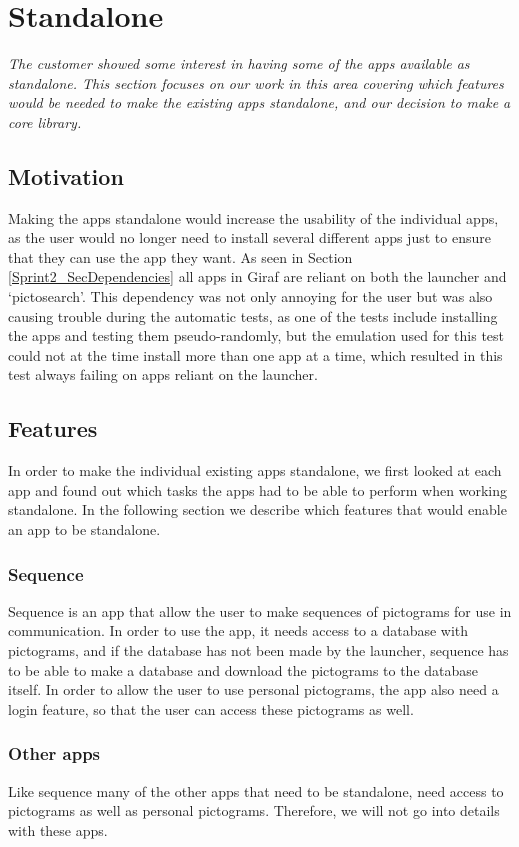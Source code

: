 \section{Standalone} \label{Sprint2_SecStandalone}
\textit{The customer showed some interest in having some of the apps available as standalone. This section focuses on our work in this area covering which features would be needed to make the existing apps standalone, and our decision to make a core library.}

\subsection{Motivation}
Making the apps standalone would increase the usability of the individual apps, as the user would no longer need to install several different apps just to ensure that they can use the app they want. As seen in Section \ref{Sprint2_SecDependencies} all apps in Giraf are reliant on both the launcher and ‘pictosearch’. This dependency was not only annoying for the user but was also causing trouble during the automatic tests, as one of the tests include installing the apps and testing them pseudo-randomly, but the emulation used for this test could not at the time install more than one app at a time, which resulted in this test always failing on apps reliant on the launcher.

\subsection{Features}
In order to make the individual existing apps standalone, we first looked at each app and found out which tasks the apps had to be able to perform when working standalone. In the following section we describe which features that would enable an app to be standalone.

\subsubsection{Sequence}
Sequence is an app that allow the user to make sequences of pictograms for use in communication. In order to use the app, it needs access to a database with pictograms, and if the database has not been made by the launcher, sequence has to be able to make a database and download the pictograms to the database itself. In order to allow the user to use personal pictograms, the app also need a login feature, so that the user can access these pictograms as well.

\subsubsection{Other apps}
Like sequence many of the other apps that need to be standalone, need access to pictograms as well as personal pictograms. Therefore, we will not go into details with these apps. 

